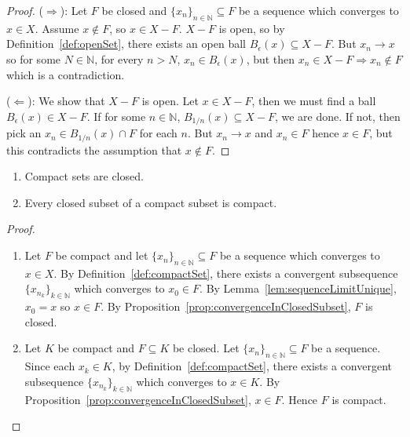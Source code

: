 \begin{proof}
	($\Rightarrow$): Let $F$ be closed and $\{ x_n \}_{n \in \mathbb{N}} \subseteq F$ be a sequence which converges to $x \in X$. Assume $x \notin F$, so $x \in X - F$. $X - F$ is open, so by Definition~\ref{def:openSet}, there exists an open ball $B_{\epsilon}(x) \subseteq X - F$. But $x_n \rightarrow x$ so for some $N \in \mathbb{N}$, for every $n > N$, $x_n \in B_{\epsilon}(x)$, but then $x_n \in X - F \Longrightarrow x_n \notin F$ which is a contradiction.
	
	($\Leftarrow$): We show that $X - F$ is open. Let $x \in X - F$, then we must find a ball $B_{\epsilon}(x) \in X - F$. If for some $n \in \mathbb{N}$, $B_{1 / n}(x) \subseteq X - F$, we are done. If not, then pick an $x_n \in B_{1 / n}(x) \cap F$ for each $n$. But $x_n \rightarrow x$ and $x_n \in F$ hence $x \in F$, but this contradicts the assumption that $x \notin F$.
\end{proof}

\begin{corollary}\label{cor:compactSetsClosedAndHaveCompactCloseSubsets}
	\hfill
	\begin{enumerate}
		\item Compact sets are closed.
		\item Every closed subset of a compact subset is compact.
	\end{enumerate}
\end{corollary}

\begin{proof}
	\hfill
	\begin{enumerate}
		\item Let $F$ be compact and let $\{ x_n \}_{n \in \mathbb{N}} \subseteq F$ be a sequence which converges to $x \in X$. By Definition~\ref{def:compactSet}, there exists a convergent subsequence $\{ x_{n_k} \}_{k \in \mathbb{N}}$ which converges to $x_0 \in F$. By Lemma~\ref{lem:sequenceLimitUnique}, $x_0 = x$ so $x \in F$. By Proposition~\ref{prop:convergenceInClosedSubset}, $F$ is closed.
		\item Let $K$ be compact and $F \subseteq K$ be closed. Let $\{ x_n \}_{n \in \mathbb{N}} \subseteq F$ be a sequence. Since each $x_k \in K$, by Definition~\ref{def:compactSet}, there exists a convergent subsequence $\{ x_{n_k} \}_{k \in \mathbb{N}}$ which converges to $x \in K$. By Proposition~\ref{prop:convergenceInClosedSubset}, $x \in F$. Hence $F$ is compact.
	\end{enumerate}
\end{proof}

